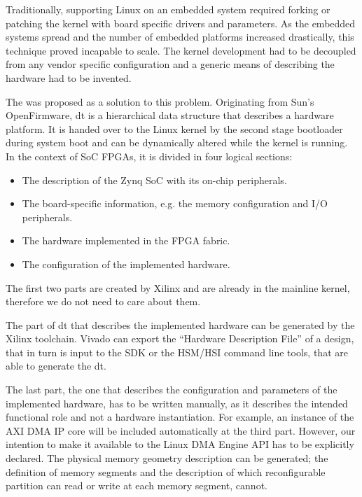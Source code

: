 Traditionally, supporting Linux on an embedded system required forking or patching the kernel
with board specific drivers and parameters. As the embedded systems spread and the number
of embedded platforms increased drastically, this technique proved incapable to scale.
The kernel development had to be decoupled from any vendor specific configuration
and a generic means of describing the hardware had to be invented.

The  was proposed as a solution to this problem. Originating from Sun's OpenFirmware,
\gls{dt} is a hierarchical data structure that describes a hardware platform.
It is handed over to the Linux kernel by the second stage bootloader during system boot
and can be dynamically altered while the kernel is running.
In the context of SoC FPGAs, it is divided in four logical sections:

\begin{itemize}
\item	The description of the Zynq SoC with its on-chip peripherals.
\item	The board-specific information, e.g. the memory configuration and I/O peripherals.
\item	The hardware implemented in the FPGA \gls{fabric}.
\item	The configuration of the implemented hardware.
\end{itemize}

The first two parts are created by Xilinx and are already in the mainline kernel, 
therefore we do not need to care about them.

The part of \gls{dt} that describes the implemented hardware can be generated by the
Xilinx toolchain. Vivado can export the ``Hardware Description File'' of a design,
that in turn is input to the SDK or the HSM/HSI command line tools, that are able
to generate the \gls{dt}.

The last part, the one that describes the configuration and parameters of the implemented hardware,
has to be written manually, as it describes the intended functional role and not a hardware instantiation.
For example, an instance of the AXI DMA IP core will be included automatically at the third part.
However, our intention to make it available to the Linux DMA Engine API has to be explicitly declared. 
The physical memory geometry description can be generated;
the definition of memory segments and the description of which reconfigurable partition
can read or write at each memory segment, cannot.

